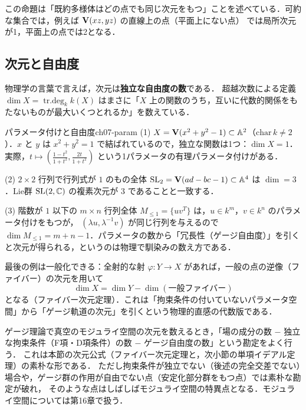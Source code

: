 この命題は「既約多様体はどの点でも同じ次元をもつ」ことを述べている．可約な集合では，例えば $\mathbf{V}(xz,yz)$ の直線上の点（平面上にない点）
では局所次元が1，平面上の点では2となる．

\subsection{次元と自由度}

物理学の言葉で言えば，次元は\textbf{独立な自由度の数}である．
超越次数による定義 $\dim X=\mathop{\mathrm{tr.deg}}\nolimits_k k(X)$ はまさに「$X$ 上の関数のうち，互いに代数的関係をもたないものが最大いくつとれるか」を数えている．

\begin{myex}{パラメータ付けと自由度}{ch07-param}
(1) $X=\mathbf{V}(x^2+y^2-1)\subset\mathbb{A}^2$（$\mathrm{char}\,k\ne2$）．$x$ と $y$ は $x^2+y^2=1$ で結ばれているので，独立な関数は1つ：$\dim X=1$．
実際，$t\mapsto\left(\frac{1-t^2}{1+t^2},\frac{2t}{1+t^2}\right)$ という1パラメータの有理パラメータ付けがある．

(2) $2\times2$ 行列で行列式が $1$ のもの全体 $\operatorname{SL}_2=\mathbf{V}(ad-bc-1)\subset\mathbb{A}^4$ は $\dim=3$．Lie群 $\operatorname{SL}(2,\mathbb{C})$ の複素次元が $3$ であることと一致する．

(3) 階数が $1$ 以下の $m\times n$ 行列全体 $M_{\le1}=\{u v^{T}\}$ は，$u\in k^m$，$v\in k^n$ のパラメータ付けをもつが，
$(\lambda u,\lambda^{-1}v)$ が同じ行列を与えるので $\dim M_{\le1}=m+n-1$．パラメータの数から「冗長性（ゲージ自由度）」を引くと次元が得られる，というのは物理で馴染みの数え方である．
\end{myex}

最後の例は一般化できる：全射的な射 $\varphi:Y\to X$ があれば，一般の点の逆像（ファイバー）の次元を用いて
\[
  \dim X=\dim Y-\dim(\text{一般ファイバー})
\]
となる（ファイバー次元定理）．これは「拘束条件の付いていないパラメータ空間」から「ゲージ軌道の次元」を引くという物理的直感の代数版である．

\begin{physbox}[自由度の数え方]
ゲージ理論で真空のモジュライ空間の次元を数えるとき，「場の成分の数 $-$ 独立な拘束条件（F項・D項条件）の数 $-$ ゲージ自由度の数」という勘定をよく行う．
これは本節の次元公式（ファイバー次元定理と，次小節の単項イデアル定理）の素朴な形である．
ただし拘束条件が独立でない（後述の完全交差でない）場合や，ゲージ群の作用が自由でない点（安定化部分群をもつ点）では素朴な勘定が破れ，
そのような点はしばしばモジュライ空間の特異点となる．モジュライ空間については第16章で扱う．
\end{physbox}

